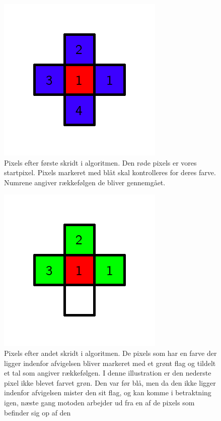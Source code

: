 {\begin{figure}[!h]
    \begin{center}
        \includegraphics[scale=0.42,angle=0]{afsnit/vores_implementation/billeder/flood_fill/floodfill2}
    \end{center}
    \caption[]{Pixels efter første skridt i algoritmen. Den røde pixels
    er vores startpixel. Pixels markeret med blåt skal kontrolleres for
    deres farve. Numrene angiver rækkefølgen de bliver gennemgået.}
    \label{floodfill2}
\end{figure}

\begin{figure}[!h]
    \begin{center}
        \includegraphics[scale=0.42,angle=0]{afsnit/vores_implementation/billeder/flood_fill/floodfill3}
    \end{center}
    \caption[]{Pixels efter andet skridt i algoritmen. De pixels som har
    en farve der ligger indenfor afvigelsen bliver markeret med et grønt
    flag og tildelt et tal som angiver rækkefølgen. I denne illustration
    er den nederste pixel ikke blevet farvet grøn. Den var før blå, men
    da den ikke ligger indenfor afvigelsen mister den sit flag, og kan
    komme i betraktning igen, næste gang motoden arbejder ud fra en af
    de pixels som befinder sig op af den}
    \label{floodfill3}
\end{figure}

}
